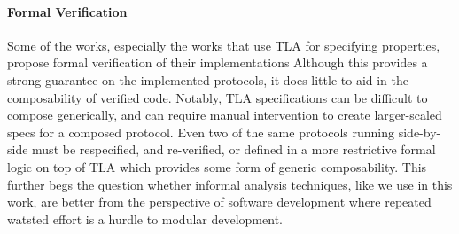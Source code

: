 \paragraph{Formal Verification}
Some of the works, especially the works that use TLA for specifying properties, propose formal verification of their implementations \cite{hawblitze2015ironfleet, bolosky2007farsite}
Although this provides a strong guarantee on the implemented protocols, it does little to aid in the composability of verified code.
Notably, TLA specifications can be difficult to compose generically, and can require manual intervention to create larger-scaled specs for a composed protocol.
Even two of the same protocols running side-by-side must be respecified, and re-verified, or defined in a more restrictive formal logic on top of TLA which provides some form of generic composability.
This further begs the question whether informal analysis techniques, like we use in this work, are better from the perspective of software development where repeated watsted effort is a hurdle to modular development.


